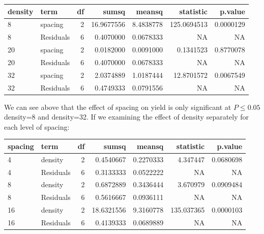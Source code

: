 \documentclass[
]{book}
\newenvironment{Shaded}{\begin{snugshade}}{\end{snugshade}}
\newcommand{\AttributeTok}[1]{\textcolor[rgb]{0.77,0.63,0.00}{#1}}
\newcommand{\FunctionTok}[1]{\textcolor[rgb]{0.00,0.00,0.00}{#1}}
\newcommand{\NormalTok}[1]{#1}
\newcommand{\OtherTok}[1]{\textcolor[rgb]{0.56,0.35,0.01}{#1}}
\newcommand{\SpecialCharTok}[1]{\textcolor[rgb]{0.00,0.00,0.00}{#1}}
\newcommand{\StringTok}[1]{\textcolor[rgb]{0.31,0.60,0.02}{#1}}
\begin{document}
\begin{tabular}{l|l|r|r|r|r|r}
\hline
density & term & df & sumsq & meansq & statistic & p.value\\
\hline
8 & spacing & 2 & 16.9677556 & 8.4838778 & 125.0694513 & 0.0000129\\
\hline
8 & Residuals & 6 & 0.4070000 & 0.0678333 & NA & NA\\
\hline
20 & spacing & 2 & 0.0182000 & 0.0091000 & 0.1341523 & 0.8770078\\
\hline
20 & Residuals & 6 & 0.4070000 & 0.0678333 & NA & NA\\
\hline
32 & spacing & 2 & 2.0374889 & 1.0187444 & 12.8701572 & 0.0067549\\
\hline
32 & Residuals & 6 & 0.4749333 & 0.0791556 & NA & NA\\
\hline
\end{tabular}

We can see above that the effect of spacing on yield is only significant at \(P\le0.05\) density=8 and density=32. If we examining the effect of density separately for each level of spacing:

\begin{Shaded}
\end{Shaded}

\begin{tabular}{l|l|r|r|r|r|r}
\hline
spacing & term & df & sumsq & meansq & statistic & p.value\\
\hline
4 & density & 2 & 0.4540667 & 0.2270333 & 4.347447 & 0.0680698\\
\hline
4 & Residuals & 6 & 0.3133333 & 0.0522222 & NA & NA\\
\hline
8 & density & 2 & 0.6872889 & 0.3436444 & 3.670979 & 0.0909484\\
\hline
8 & Residuals & 6 & 0.5616667 & 0.0936111 & NA & NA\\
\hline
16 & density & 2 & 18.6321556 & 9.3160778 & 135.037365 & 0.0000103\\
\hline
16 & Residuals & 6 & 0.4139333 & 0.0689889 & NA & NA\\
\hline
\end{tabular}
\end{document}
